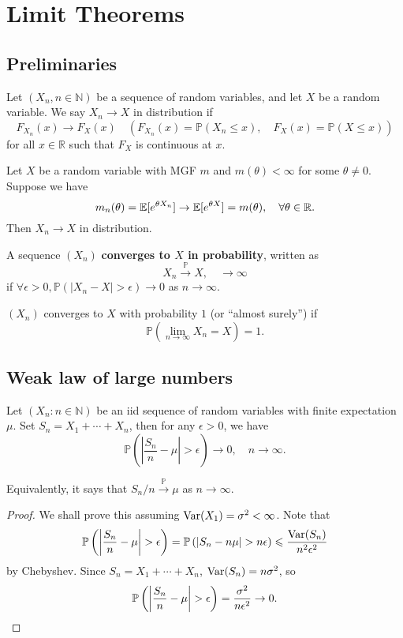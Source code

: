 \section{Limit Theorems}
\subsection{Preliminaries}
\begin{definition}
    Let $(X_n,n\in\mathbb N)$ be a sequence of random variables, and let $X$ be a random variable. We say $X_n\to X$ in distribution if
    $$F_{X_n}(x)\to F_X(x)\quad (F_{X_n}(x)=\mathbb P(X_n\le x),\quad F_X(x)=\mathbb P(X\le x))$$
    for all $x\in\mathbb R$ such that $F_X$ is continuous at $x$.
\end{definition}

\begin{theorem}
    Let $X$ be a random variable with MGF $m$ and $m(\theta)<\infty$ for some $\theta\neq 0$.
    Suppose we have
    $$m_n(\theta)=\mathbb E[e^{\theta X_n}]\to {\mathbb{E}}[e^{\theta X}] = m(\theta),\quad\forall\theta\in\mathbb R.$$
    Then $X_n\to X$ in distribution.
\end{theorem}

\begin{definition}
    A sequence $(X_n)$ \textbf{converges to $X$ in probability}, written as
    $$X_n\xrightarrow{\mathbb P}X,\quad \to\infty$$
    if $\forall\epsilon>0,\mathbb P(|X_n-X|>\epsilon)\to 0$ as $n\to\infty$.
\end{definition}

\begin{definition}
    $(X_n)$ converges to $X$ with probability $1$ (or ``almost surely'') if
    $$\mathbb P\left(\lim_{n\to\infty}X_n=X\right)=1.$$
\end{definition}

\subsection{Weak law of large numbers}
\begin{theorem}\label{thm:Weak law of large numbers}
    Let $(X_n:n\in\mathbb N)$ be an iid sequence of random variables with finite expectation $\mu$.
    Set $S_n=X_1+\cdots+X_n$, then for any $\epsilon>0$, we have
    $$\mathbb P\left( \left|\frac{S_n}{n}-\mu\right|>\epsilon \right)\to 0,\quad n\to\infty.$$
\end{theorem}
\begin{note}
    Equivalently, it says that $S_n/n\xrightarrow{\mathbb P}\mu$ as $n\to\infty$.
\end{note}
\begin{proof}
    We shall prove this assuming $\operatorname{Var} (X_1)=\sigma^2<\infty$. Note that 
    \[
        \mathbb{P}\left( \left| \frac{S_n}{n}-\mu \right| >\epsilon \right) = \mathbb{P}\left( \left| S_n-n\mu \right| >n\epsilon \right) \leqslant \frac{\operatorname{Var}(S_n)}{n^2 \epsilon^2}
    \]
    by Chebyshev. Since $ S_n=X_1+\cdots+X_n $, $ \operatorname{Var}(S_n)=n\sigma^2 $, so 
    \[
        \mathbb{P}\left( \left| \frac{S_n}{n}-\mu \right| >\epsilon \right)=\frac{\sigma^2}{n\epsilon^2}\to 0.\qedhere
    \]
\end{proof}